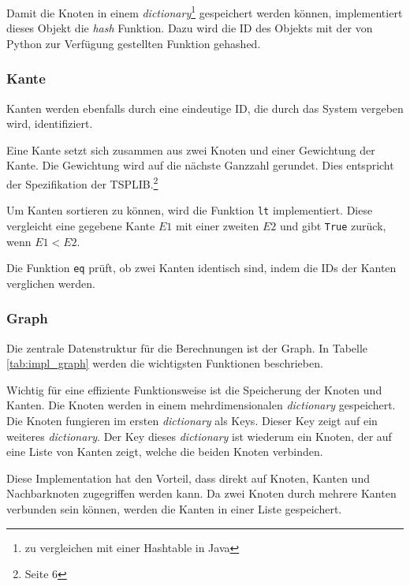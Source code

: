 \documentclass[11pt,a4paper]{article}
\begin{document}
Damit die Knoten in einem \emph{dictionary}\footnote{zu vergleichen mit einer Hashtable in Java} gespeichert werden können, implementiert dieses Objekt die \emph{hash} Funktion. Dazu wird die ID des Objekts mit der von Python zur Verfügung gestellten Funktion gehashed.

\subsubsection{Kante}
Kanten werden ebenfalls durch eine eindeutige ID, die durch das System vergeben wird, identifiziert.

Eine Kante setzt sich zusammen aus zwei Knoten und einer Gewichtung der Kante. Die Gewichtung wird auf die nächste Ganzzahl gerundet. Dies entspricht der Spezifikation der TSPLIB.\footnote{\cite{reinelt95} Seite 6}

Um Kanten sortieren zu können, wird die Funktion \texttt{\textunderscore\textunderscore lt\textunderscore\textunderscore} implementiert. Diese vergleicht eine gegebene Kante $E1$ mit einer zweiten $E2$ und gibt \texttt{True} zurück, wenn $E1 < E2$.

Die Funktion \texttt{\textunderscore\textunderscore eq\textunderscore\textunderscore} prüft, ob zwei Kanten identisch sind, indem die IDs der Kanten verglichen werden.

\subsubsection{Graph}
Die zentrale Datenstruktur für die Berechnungen ist der Graph. In Tabelle \ref{tab:impl_graph} werden die wichtigsten Funktionen beschrieben.

Wichtig für eine effiziente Funktionsweise ist die Speicherung der Knoten und Kanten. Die Knoten werden in einem mehrdimensionalen \emph{dictionary} gespeichert. Die Knoten fungieren im ersten \emph{dictionary} als Keys. Dieser Key zeigt auf ein weiteres \emph{dictionary}. Der Key dieses \emph{dictionary} ist wiederum ein Knoten, der auf eine Liste von Kanten zeigt, welche die beiden Knoten verbinden.

Diese Implementation hat den Vorteil, dass direkt auf Knoten, Kanten und Nachbarknoten zugegriffen werden kann. Da zwei Knoten durch mehrere Kanten verbunden sein können, werden die Kanten in einer Liste gespeichert.
\end{document}
